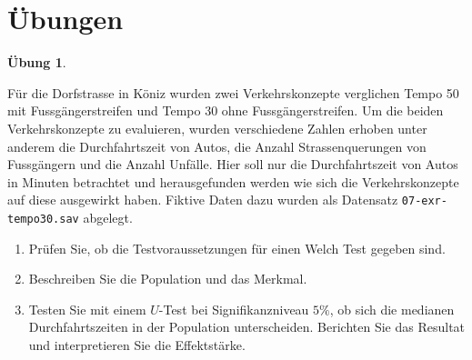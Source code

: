 \documentclass[
]{book}
\providecommand{\tightlist}{%
  \setlength{\itemsep}{0pt}\setlength{\parskip}{0pt}}
\theoremstyle{definition}
\theoremstyle{definition}
\theoremstyle{definition}
\newtheorem{exercise}{Übung}[chapter]
\theoremstyle{definition}
\theoremstyle{remark}
\begin{document}
\section{Übungen}\label{uxfcbungen-4}

\begin{exercise}
\protect\hypertarget{exr:tempo30}{}\label{exr:tempo30}\leavevmode

Für die Dorfstrasse in Köniz wurden zwei Verkehrskonzepte verglichen Tempo 50 mit Fussgängerstreifen und Tempo 30 ohne Fussgängerstreifen. Um die beiden Verkehrskonzepte zu evaluieren, wurden verschiedene Zahlen erhoben unter anderem die Durchfahrtszeit von Autos, die Anzahl Strassenquerungen von Fussgängern und die Anzahl Unfälle. Hier soll nur die Durchfahrtszeit von Autos in Minuten betrachtet und herausgefunden werden wie sich die Verkehrskonzepte auf diese ausgewirkt haben. Fiktive Daten dazu wurden als Datensatz \texttt{07-exr-tempo30.sav} abgelegt.

\begin{enumerate}
\def\labelenumi{\alph{enumi})}
\tightlist
\item
  Prüfen Sie, ob die Testvoraussetzungen für einen Welch Test gegeben sind.
\item
  Beschreiben Sie die Population und das Merkmal.
\item
  Testen Sie mit einem \(U\)-Test bei Signifikanzniveau \(5\%\), ob sich die medianen Durchfahrtszeiten in der Population unterscheiden. Berichten Sie das Resultat und interpretieren Sie die Effektstärke.
\end{enumerate}

\end{exercise}
\end{document}

